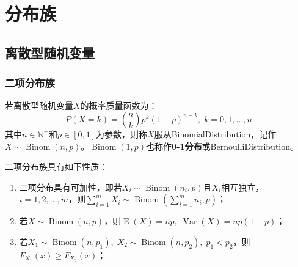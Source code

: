 \section{分布族}

\subsection{离散型随机变量}
\subsubsection{二项分布族}
\begin{definition}
	若离散型随机变量$X$的概率质量函数为：
	\begin{equation*}
		P(X=k)=\binom{n}{k}p^k(1-p)^{n-k},\;k=0,1,\dots,n
	\end{equation*}
	其中$n\in\mathbb{N}^+$和$p\in[0,1]$为参数，则称$X$服从\gls{BinomialDistribution}，记作$X\sim\operatorname{Binom}(n,p)$。$\operatorname{Binom}(1,p)$也称作\textbf{0-1分布}或\gls{BernoulliDistribution}。
\end{definition}
\begin{property}\label{prop:Binom}
	二项分布族具有如下性质：
	\begin{enumerate}
		\item 二项分布具有可加性，即若$X_i\sim\operatorname{Binom}(n_i,p)$且$X_i$相互独立，$i=1,2,\dots,m$，则$\sum\limits_{i=1}^{m}X_i\sim\operatorname{Binom}\left(\sum\limits_{i=1}^{m}n_i,p\right)$；
		\item 若$X\sim\operatorname{Binom}(n,p)$，则$\operatorname{E}(X)=np,\;\operatorname{Var}(X)=np(1-p)$；
		\item 若$X_1\sim\operatorname{Binom}(n,p_1),\;X_2\sim\operatorname{Binom}(n,p_2),\;p_1<p_2$，则$F_{X_1}(x)\geqslant F_{X_2}(x)$；
	\end{enumerate}
\end{property}

